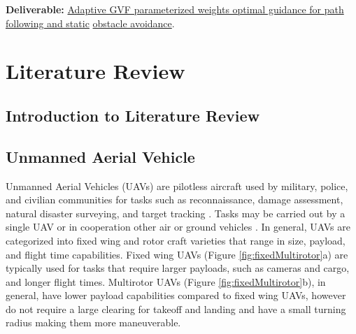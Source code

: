 \documentclass[numbered,pdftex]{ohio-etd}
\begin{document}
 \noindent
 \textbf{Deliverable:} \underline{Adaptive GVF parameterized weights optimal guidance for path following and static} \underline{ obstacle avoidance}.
 
 





\chapter{Literature Review}
\section{Introduction to Literature Review}


\section{Unmanned Aerial Vehicle}

Unmanned Aerial Vehicles (UAVs) are pilotless aircraft used by military, police, and civilian communities for tasks such as reconnaissance, damage assessment, natural disaster surveying, and target tracking \cite{ariyur_autonomous_2008,teuliere_chasing_2011}. Tasks may be carried out by a single UAV or in cooperation other air or ground vehicles \cite{oh_coordinated_2013,hyondong_oh_coordinated_2015,ulun_coordinated_2013}. In general, UAVs are categorized into fixed wing and rotor craft varieties \cite{beard_small_2012} that range in size, payload, and flight time capabilities. Fixed wing UAVs (Figure \ref{fig:fixedMultirotor}a) are typically used for tasks that require larger payloads, such as cameras and cargo, and longer flight times. Multirotor UAVs (Figure \ref{fig:fixedMultirotor}b), in general, have lower payload capabilities compared to fixed wing UAVs, however do not require a large clearing for takeoff and landing and have a small turning radius making them more maneuverable.
\end{document}
